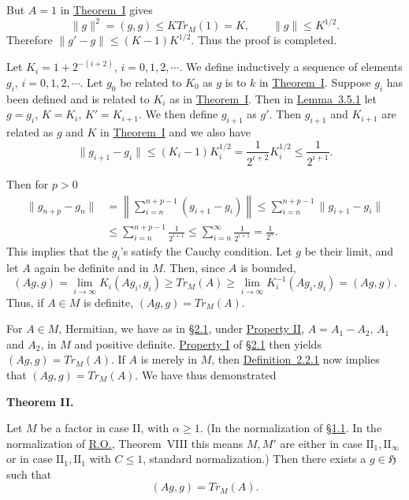 \documentclass[twoside,leqno]{article}
\newcommand{\TrM}{Tr_M}
\newcommand{\RO}{\href{https://doi.org/10.2307/1968693}{R.O.}}
\newcommand{\SectionRef}[1]{\hyperlink{sec:#1}{\S#1}}
\newcommand{\StatementTarget}[1]{\phantomsection\hypertarget{stmt:#1}{}}
\newcommand{\StatementRef}[2]{\hyperlink{stmt:#1}{#2}}
\newenvironment{statement}[2]{%
  \par\medskip
  \noindent\StatementTarget{#1}\hspace*{\parindent}\textbf{#2.}\ \itshape\ignorespaces
}{\par}
\begin{document}
But $A=1$ in \StatementRef{theorem:I}{Theorem~I} gives
\[
 \lVert g\rVert^2=(g,g)\leq K\TrM(1)=K,
 \qquad \lVert g\rVert\leq K^{1/2}.
\]
Therefore $\lVert g'-g\rVert\leq(K-1)K^{1/2}$. Thus the proof is
completed.

Let $K_i=1+2^{-(i+2)}$, $i=0,1,2,\cdots$. We define inductively a sequence
of elements $g_i$, $i=0,1,2,\cdots$. Let $g_0$ be related to $K_0$ as $g$
is to $k$ in \StatementRef{theorem:I}{Theorem~I}. Suppose $g_i$ has been
defined and is related to $K_i$ as in \StatementRef{theorem:I}{Theorem~I}.
Then in \StatementRef{lemma:3.5.1}{Lemma~3.5.1} let
$g=g_i$, $K=K_i$, $K'=K_{i+1}$. We then define $g_{i+1}$ as $g'$. Then
$g_{i+1}$ and $K_{i+1}$ are related as $g$ and $K$ in
\StatementRef{theorem:I}{Theorem~I} and we also have
\[
 \lVert g_{i+1}-g_i\rVert
 \leq(K_i-1)K_i^{1/2}
 =\frac1{2^{i+2}}K_i^{1/2}
 \leq\frac1{2^{i+1}}.
\]

Then for $p>0$
\begin{align*}
 \lVert g_{n+p}-g_n\rVert
 &=\left\lVert\sum_{i=n}^{n+p-1}(g_{i+1}-g_i)\right\rVert
 \leq\sum_{i=n}^{n+p-1}\lVert g_{i+1}-g_i\rVert\\
 &\leq\sum_{i=n}^{n+p-1}\frac1{2^{i+1}}
 \leq\sum_{i=n}^{\infty}\frac1{2^{i+1}}=\frac1{2^n}.
\end{align*}
This implies that the $g_i$'s satisfy the Cauchy condition. Let $g$ be
their limit, and let $A$ again be definite and in $M$. Then, since $A$ is
bounded,
\[
 (Ag,g)=\lim_{i\to\infty}K_i(Ag_i,g_i)
 \geq\TrM(A)
 \geq\lim_{i\to\infty}K_i^{-1}(Ag_i,g_i)=(Ag,g).
\]
Thus, if $A\in M$ is definite, $(Ag,g)=\TrM(A)$.

For $A\in M$, Hermitian, we have as in \SectionRef{2.1}, under
\StatementRef{property:II}{Property II}, $A=A_1-A_2$, $A_1$ and $A_2$, in $M$ and positive definite.
\StatementRef{property:I}{Property I} of \SectionRef{2.1} then yields
$(Ag,g)=\TrM(A)$. If $A$ is merely in $M$, then
\StatementRef{definition:2.2.1}{Definition~2.2.1} now implies that
$(Ag,g)=\TrM(A)$. We have thus demonstrated

\begin{statement}{theorem:II}{Theorem II}
Let $M$ be a factor in case II, with $\alpha\geq1$. (In the normalization of
\SectionRef{1.1}. In the normalization of \RO{}, Theorem~VIII
this means $M,M'$ are either in case $\mathrm{II}_1,\mathrm{II}_\infty$ or
in case $\mathrm{II}_1,\mathrm{II}_1$ with $C\leq1$, standard
normalization.) Then there exists a $g\in\mathfrak H$ such that
\[
 (Ag,g)=\TrM(A).
\]
\end{statement}
\end{document}
